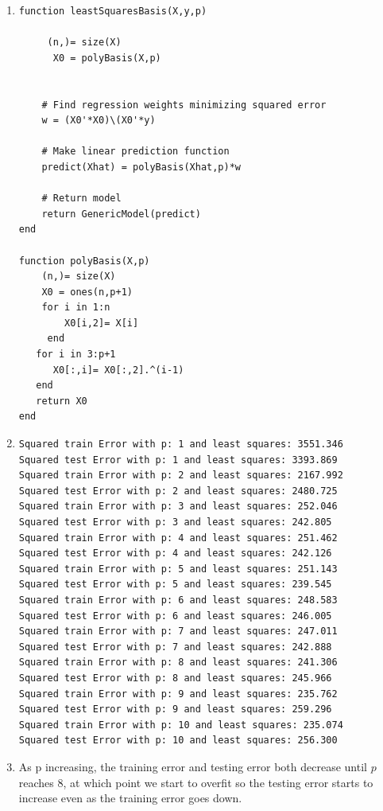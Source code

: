 \documentclass{article}
\begin{document}
\begin{enumerate}
 
\item
\begin{verbatim}
function leastSquaresBasis(X,y,p)

     (n,)= size(X)
      X0 = polyBasis(X,p)


    # Find regression weights minimizing squared error
    w = (X0'*X0)\(X0'*y)

    # Make linear prediction function
    predict(Xhat) = polyBasis(Xhat,p)*w

    # Return model
    return GenericModel(predict)
end

function polyBasis(X,p)
    (n,)= size(X)
    X0 = ones(n,p+1)
    for i in 1:n
        X0[i,2]= X[i]
     end 
   for i in 3:p+1
      X0[:,i]= X0[:,2].^(i-1)
   end
   return X0
end 
 \end{verbatim}


\item
 \begin{verbatim}
Squared train Error with p: 1 and least squares: 3551.346
Squared test Error with p: 1 and least squares: 3393.869
Squared train Error with p: 2 and least squares: 2167.992
Squared test Error with p: 2 and least squares: 2480.725
Squared train Error with p: 3 and least squares: 252.046
Squared test Error with p: 3 and least squares: 242.805
Squared train Error with p: 4 and least squares: 251.462
Squared test Error with p: 4 and least squares: 242.126
Squared train Error with p: 5 and least squares: 251.143
Squared test Error with p: 5 and least squares: 239.545
Squared train Error with p: 6 and least squares: 248.583
Squared test Error with p: 6 and least squares: 246.005
Squared train Error with p: 7 and least squares: 247.011
Squared test Error with p: 7 and least squares: 242.888
Squared train Error with p: 8 and least squares: 241.306
Squared test Error with p: 8 and least squares: 245.966
Squared train Error with p: 9 and least squares: 235.762
Squared test Error with p: 9 and least squares: 259.296
Squared train Error with p: 10 and least squares: 235.074
Squared test Error with p: 10 and least squares: 256.300
 \end{verbatim}

\item As p increasing, the training error and testing error both decrease until $p$ reaches 8, at which point we start to overfit so the testing error starts to increase even as the training error goes down.

\end{enumerate}
\end{document}
